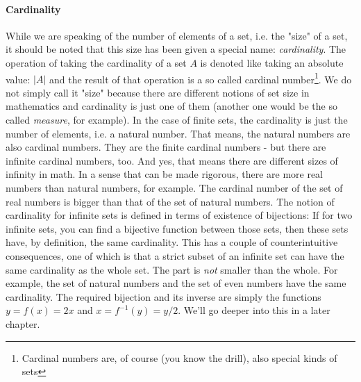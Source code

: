 

\paragraph{Cardinality} While we are speaking of the number of elements of a set, i.e. the "size" of a set, it should be noted that this size has been given a special name: \emph{cardinality}. The operation of taking the cardinality of a set $A$ is denoted like taking an absolute value: $|A|$ and the result of that operation is a so called cardinal number\footnote{Cardinal numbers are, of course (you know the drill), also special kinds of sets}. We do not simply call it "size" because there are different notions of set size in mathematics and cardinality is just one of them (another one would be the so called \emph{measure}, for example). In the case of finite sets, the cardinality is just the number of elements, i.e. a natural number. That means, the natural numbers are also cardinal numbers. They are the finite cardinal numbers - but there are infinite cardinal numbers, too. And yes, that means there are different sizes of infinity in math. In a sense that can be made rigorous, there are more real numbers than natural numbers, for example. The cardinal number of the set of real numbers is bigger than that of the set of natural numbers. The notion of cardinality for infinite sets is defined in terms of existence of bijections: If for two infinite sets, you can find a bijective function between those sets, then these sets have, by definition, the same cardinality. This has a couple of counterintuitive consequences, one of which is that a strict subset of an infinite set can have the same cardinality as the whole set. The part is \emph{not} smaller than the whole. For example, the set of natural numbers and the set of even numbers have the same cardinality. The required bijection and its inverse are simply the functions $y = f(x) = 2 x$ and $x = f^{-1}(y) = y / 2$. We'll go deeper into this in a later chapter.


